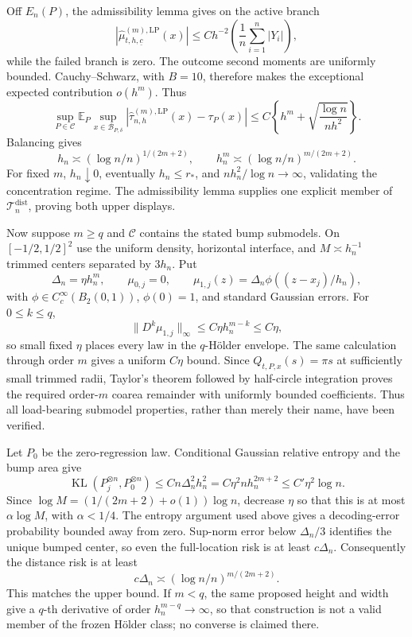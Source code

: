 Off \(E_n(P)\), the admissibility lemma gives on the active branch
\[
 |\widehat\mu^{(m),\mathrm{LP}}_{t,h,\underline c}(x)|
 \leq Ch^{-2}\left(\frac1n\sum_{i=1}^n|Y_i|\right),
\]
while the failed branch is zero.  The outcome second moments are uniformly bounded.  Cauchy--Schwarz, with \(B=10\), therefore makes the exceptional expected contribution \(o(h^m)\).  Thus
\[
 \sup_{P\in\mathcal C}\mathbb E_P\sup_{x\in\mathcal B_{P,\delta}}
 |\widehat\tau^{(m),\mathrm{LP}}_{n,h}(x)-\tau_P(x)|
 \leq C\left\{h^m+\sqrt{\frac{\log n}{nh^2}}\right\}.
\]
Balancing gives
\[
 h_n\asymp(\log n/n)^{1/(2m+2)},
 \qquad h_n^m\asymp(\log n/n)^{m/(2m+2)}.
\]
For fixed \(m\), \(h_n\downarrow0\), eventually \(h_n\leq r_*\), and \(nh_n^2/\log n\to\infty\), validating the concentration regime.  The admissibility lemma supplies one explicit member of \(\mathcal T_n^{\mathrm{dist}}\), proving both upper displays.

Now suppose \(m\geq q\) and \(\mathcal C\) contains the stated bump submodels.  On \([-1/2,1/2]^2\) use the uniform density, horizontal interface, and \(M\asymp h_n^{-1}\) trimmed centers separated by \(3h_n\).  Put
\[
 \Delta_n=\eta h_n^m,
 \qquad \mu_{0,j}=0,
 \qquad \mu_{1,j}(z)=\Delta_n\phi((z-x_j)/h_n),
\]
with \(\phi\in C_c^\infty(B_2(0,1))\), \(\phi(0)=1\), and standard Gaussian errors.  For \(0\leq k\leq q\),
\[
 \lVert D^k\mu_{1,j}\rVert_\infty
 \leq C\eta h_n^{m-k}\leq C\eta,
\]
so small fixed \(\eta\) places every law in the \(q\)-H\"older envelope.  The same calculation through order \(m\) gives a uniform \(C\eta\) bound.  Since \(Q_{t,P,x}(s)=\pi s\) at sufficiently small trimmed radii, Taylor's theorem followed by half-circle integration proves the required order-\(m\) coarea remainder with uniformly bounded coefficients.  Thus all load-bearing submodel properties, rather than merely their name, have been verified.

Let \(P_0\) be the zero-regression law.  Conditional Gaussian relative entropy and the bump area give
\[
 \operatorname{KL}(P_j^{\otimes n},P_0^{\otimes n})
 \leq Cn\Delta_n^2h_n^2
 =C\eta^2nh_n^{2m+2}\leq C'\eta^2\log n.
\]
Since \(\log M=(1/(2m+2)+o(1))\log n\), decrease \(\eta\) so that this is at most \(\alpha\log M\), with \(\alpha<1/4\).  The entropy argument used above gives a decoding-error probability bounded away from zero.  Sup-norm error below \(\Delta_n/3\) identifies the unique bumped center, so even the full-location risk is at least \(c\Delta_n\).  Consequently the distance risk is at least
\[
 c\Delta_n\asymp(\log n/n)^{m/(2m+2)}.
\]
This matches the upper bound.  If \(m<q\), the same proposed height and width give a \(q\)-th derivative of order \(h_n^{m-q}\to\infty\), so that construction is not a valid member of the frozen H\"older class; no converse is claimed there.

